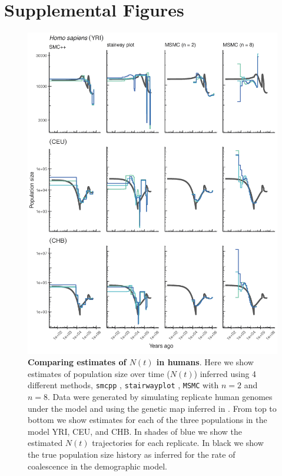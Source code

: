 \documentclass[12pt,halfline,a4paper]{ouparticle}
\newcommand{\MSMC}{\texttt{MSMC} }
\newcommand{\smcpp}{\texttt{smcpp} }
\newcommand{\stairwayplot}{\texttt{stairwayplot} }
\begin{document}
\section*{Supplemental Figures}
\begin{figure}
\begin{center}
\includegraphics[width=0.8\linewidth]{display_items/homo_sapiens_mask_Gutenkunst.png}
\caption{\textbf{Comparing estimates of $N(t)$ in humans}. Here we show estimates of population
size over time ($N(t)$) inferred using 4 different methods, \smcpp, \stairwayplot,
\MSMC with $n=2$ and $n=8$. Data were generated by simulating
replicate human genomes under the \cite{gutenkunst2009inferring} model and using the genetic map
inferred in \cite{international2007second}. From top to bottom we show estimates for each
of the three populations in the model YRI, CEU, and CHB. In shades of blue we show the estimated
$N(t)$ trajectories for each replicate. In black we show the true population size history as inferred
for the rate of coalescence in the demographic model.}
\label{fig:n_t_gutenkunst}
\end{center}
\end{figure}
\end{document}
